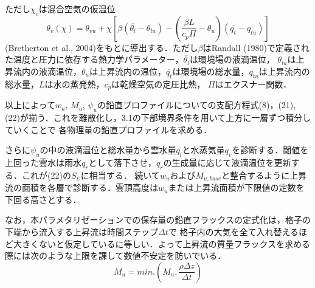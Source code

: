 \documentclass[platex, dvipdfmx]{jsarticle}
\begin{document}
ただし$\chi_c$は混合空気の仮温位
\begin{equation}
    \theta_v(\chi)=\theta_{vu}+\chi\left[ \beta(\overline{\theta_l}-\theta_{lu})-\left(\frac{\beta L}{c_p\Pi}-\theta_u\right)(\overline{q_t}-q_{tu})\right]   
\end{equation}
(Bretherton et al., 2004)をもとに導出する．ただし$\beta$はRandall (1980)で定義された温度と圧力に依存する熱力学パラメーター，$\overline{\theta_l}$は環境場の液滴温位，
$\theta_{lu}$は上昇流内の液滴温位，$\theta_u$は上昇流内の温位，$\overline{q_t}$は環境場の総水量，$q_{tu}$は上昇流内の総水量，$L$は水の蒸発熱，$c_p$は乾燥空気の定圧比熱，
$\Pi$はエクスナー関数．

以上によって$w_u$, $M_u$, $\psi_u$の鉛直プロファイルについての支配方程式(8)，(21), (22)が揃う．これを離散化し，3.1の下部境界条件を用いて上方に一層ずつ積分していくことで
各物理量の鉛直プロファイルを求める．

さらに$\psi_u$の中の液滴温位と総水量から雲水量$q_l$と水蒸気量$q_v$を診断する．閾値を上回った雲水は雨水$q_r$として落下させ，$q_r$の生成量に応じて液滴温位を更新する．これが(22)の$S_\psi$に相当する．
続いて$w_u$および$M_{u,base}$と整合するように上昇流の面積を各層で診断する．雲頂高度は$w_u$または上昇流面積が下限値の定数を下回る高さとする．

なお，本パラメタリゼーションでの保存量の鉛直フラックスの定式化は，格子の下端から流入する上昇流は時間ステップ$\Delta t$で
格子内の大気を全て入れ替えるほど大きくないと仮定しているに等しい．よって上昇流の質量フラックスを求める際には次のような上限を課して数値不安定を防いでいる．
\begin{equation}
    M_u = min.\left(M_u, \frac{\rho\Delta z}{\Delta t}\right)    
\end{equation}
\end{document}
